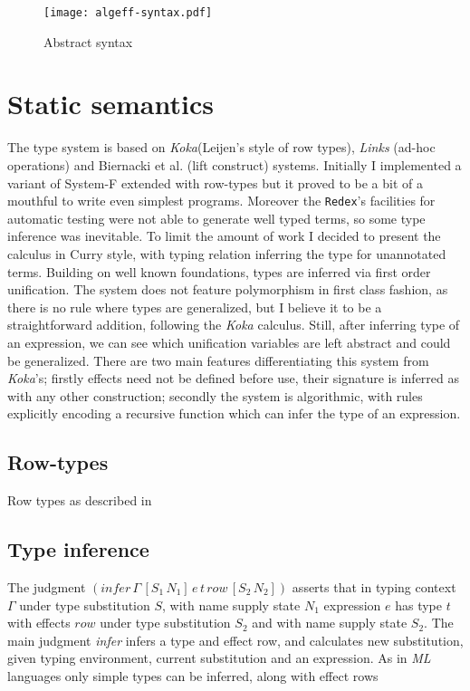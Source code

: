 \documentclass[inz, english, shortabstract]{iithesis}
\begin{document}
\begin{figure}
  \centering
  \texttt{[image: algeff-syntax.pdf]}
  \caption{Abstract syntax}
  \label{fig:algeff-syntax}
\end{figure}

\section{Static semantics}
The type system is based on \emph{Koka}(Leijen's style of row types\cite{Leijen2005}), \emph{Links}\cite{Hillerstrom2016} (ad-hoc operations) and Biernacki et al. \cite{Biernacki2017} (lift construct) systems.
Initially I implemented a variant of System-F extended with row-types but it proved to be a bit of a mouthful to write even simplest programs.
Moreover the \texttt{Redex}'s facilities for automatic testing were not able to generate well typed terms, so some type inference was inevitable.
To limit the amount of work I decided to present the calculus in Curry style, with typing relation inferring the type for unannotated terms.
Building on well known foundations, types are inferred via first order unification.
The system does not feature polymorphism in first class fashion, as there is no rule where types are generalized, but I believe it to be a straightforward addition, following the \emph{Koka}\cite{Leijen2014} calculus.
Still, after inferring type of an expression, we can see which unification variables are left abstract and could be generalized.
There are two main features differentiating this system from \emph{Koka}'s; firstly effects need not be defined before use, their signature is inferred as with any other construction; secondly the system is algorithmic, with rules explicitly encoding a recursive function which can infer the type of an expression.

\subsection{Row-types}
Row types as described in \cite{Leijen2005}

\subsection{Type inference}
The judgment $ (infer \, \Gamma \, [S_1 \, N_1] \, e \, t \, row \, [S_2 \, N_2]) $ asserts that in typing context $ \Gamma $ under type substitution $ S $, with name supply state $ N_1 $ expression $ e $ has type $ t $ with effects $ row $ under type substitution $ S_2 $ and with name supply state $ S_2 $.
The main judgment \emph{infer} infers a type and effect row, and calculates new substitution, given typing environment, current substitution and an expression.
As in \emph{ML} languages only simple types can be inferred, along with effect rows
\end{document}
